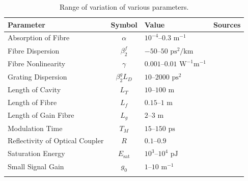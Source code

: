 \documentclass[10pt,twocolumn,a4paper]{article}
\newcommand{\Es}{E_{\textrm{sat}}}
\begin{document}
\begin{table}[tbp]
\centering
\begin{tabular}{lcll}
\hline\noalign{\smallskip}
Parameter & Symbol & Value & Sources \\
\hline\noalign{\smallskip}
Absorption of Fibre & $\alpha$ & $10^{-4}$--$0.3\text{ m}^{-1}$  & \cite{burgoyneemail, shtyrina, tomlinson, usechak, yarutkina} \\
Fibre Dispersion & $\beta_2^f$ & $-50$--$50 \text{ ps}^2/ \text{km}$ & \cite{agrawal2002, agrawal2013, burgoyne2014, litchinitser, peng, yarutkina} \\
Fibre Nonlinearity & $\gamma$ & $0.001$--$0.01 \text{ W}^{-1} \text{m}^{-1}$ & \cite{agrawal2013, finot, usechak, yarutkina} \\
Grating Dispersion & $\beta_2^g L_D$ & $10$--$2000 \text{ ps}^2$ & \cite{agrawal2002, agrawal2013, burgoyne2014, li} \\
Length of Cavity & $L_T$ & $10$--$100 \text{ m}$ & \cite{burgoyneemail, peng, tamura1996} \\
Length of Fibre & $L_f$ & $0.15$--$1 \text{ m}$ & \cite{burgoyneemail} \\
Length of Gain Fibre & $L_g$ & $2$--$3 \text{ m}$ & \cite{burgoyne2014, peng, shtyrina, tamura1993, yarutkina} \\
Modulation Time & $T_M$ & $15$--$150 \text{ ps}$ & \cite{bohun, burgoyneemail, burgoyne2014} \\
Reflectivity of Optical Coupler & $R$ & $0.1$--$0.9$ & \cite{burgoyneemail, li, peng,  tamura1993, tamura1996, yamashita} \\
Saturation Energy & $\Es$ & $10^3$--$10^4 \text{ pJ}$ & \cite{burgoyneemail, usechak, yarutkina} \\
Small Signal Gain & $g_0$ & $1$--$10 \text{ m}^{-1}$ & \cite{burgoyneemail, yarutkina} \\
\noalign{\smallskip}\hline
\end{tabular}
\caption{Range of variation of various parameters.}
\label{tab:values}
\end{table}
\end{document}
